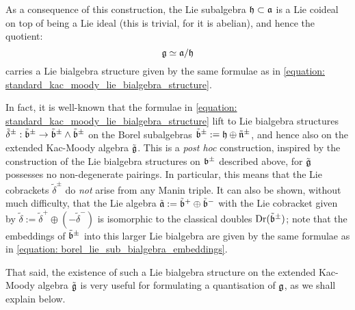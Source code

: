         As a consequence of this construction, the Lie subalgebra $\mathfrak{h} \subset \mathfrak{a}$ is a Lie coideal on top of being a Lie ideal (this is trivial, for it is abelian), and hence the quotient:
            $$\mathfrak{g} \simeq \mathfrak{a}/\mathfrak{h}$$
        carries a Lie bialgebra structure given by the same formulae as in \eqref{equation: standard_kac_moody_lie_bialgebra_structure}.
        \begin{remark}
            In fact, it is well-known that the formulae in \eqref{equation: standard_kac_moody_lie_bialgebra_structure} lift to Lie bialgebra structures $\tilde{\delta}^{\pm}: \tilde{\mathfrak{b}}^{\pm} \to \tilde{\mathfrak{b}}^{\pm} \wedge \tilde{\mathfrak{b}}^{\pm}$ on the Borel subalgebras $\tilde{\mathfrak{b}}^{\pm} := \mathfrak{h} \oplus \tilde{\mathfrak{n}}^{\pm}$, and hence also on the extended Kac-Moody algebra $\tilde{\mathfrak{g}}$. This is a \textit{post hoc} construction, inspired by the construction of the Lie bialgebra structures on $\mathfrak{b}^{\pm}$ described above, for $\tilde{\mathfrak{g}}$ possesses no non-degenerate pairings. In particular, this means that the Lie cobrackets $\tilde{\delta}^{\pm}$ do \textit{not} arise from any Manin  triple. It can also be shown, without much difficulty, that the Lie algebra $\tilde{\mathfrak{a}} := \tilde{\mathfrak{b}}^+ \oplus \tilde{\mathfrak{b}}^-$ with the Lie cobracket given by $\tilde{\delta} := \tilde{\delta}^+ \oplus (-\tilde{\delta}^-)$ is isomorphic to the classical doubles $\operatorname{Dr}(\tilde{\mathfrak{b}}^{\pm})$; note that the embeddings of $\tilde{\mathfrak{b}}^{\pm}$ into this larger Lie bialgebra are given by the same formulae as in \eqref{equation: borel_lie_sub_bialgebra_embeddings}. 

            That said, the existence of such a Lie bialgebra structure on the extended Kac-Moody algebra $\tilde{\mathfrak{g}}$ is very useful for formulating a quantisation of $\mathfrak{g}$, as we shall explain below. 
        \end{remark}

